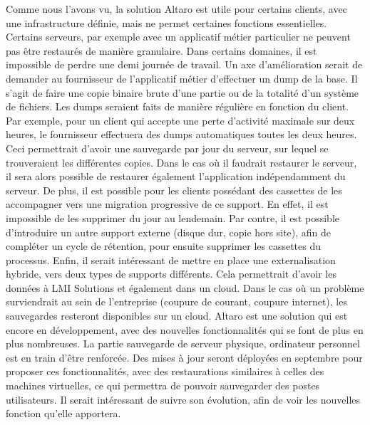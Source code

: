 \documentclass[pfe]{tnreport} %
\begin{document}
Comme nous l'avons vu, la solution Altaro est utile pour certains clients, avec une infrastructure définie, mais ne permet certaines fonctions essentielles. \newline
Certains serveurs, par exemple avec un applicatif métier particulier ne peuvent pas être restaurés de manière granulaire. Dans certains domaines, il est impossible de perdre une demi journée de travail.
Un axe d'amélioration serait de demander au fournisseur de l'applicatif métier d'effectuer un dump de la base. \newline
Il s'agit de faire une copie binaire brute d'une partie ou de la totalité d'un système de fichiers. \newline
Les dumps seraient faits de manière régulière en fonction du client. Par exemple, pour un client qui accepte une perte d'activité maximale sur deux heures, le fournisseur effectuera des dumps automatiques toutes les deux heures. \newline
Ceci permettrait d'avoir une sauvegarde par jour du serveur, sur lequel se trouveraient les différentes copies. Dans le cas où il faudrait restaurer le serveur, il sera alors possible de restaurer également l'application indépendamment du serveur. \newline
De plus, il est possible pour les clients possédant des cassettes de les accompagner vers une migration progressive de ce support. En effet, il est impossible de les supprimer du jour au lendemain. Par contre, il est possible d'introduire un autre support externe (disque dur, copie hors site), afin de compléter un cycle de rétention, pour ensuite supprimer les cassettes du processus. \newline
Enfin, il serait intéressant de mettre en place une externalisation hybride, vers deux types de supports différents. \newline
Cela permettrait d'avoir les données à LMI Solutions et également dans un cloud. Dans le cas où un problème surviendrait au sein de l'entreprise (coupure de courant, coupure internet), les sauvegardes resteront disponibles sur un cloud.\newline
Altaro est une solution qui est encore en développement, avec des nouvelles fonctionnalités qui se font de plus en plus nombreuses. \newline
La partie sauvegarde de serveur physique, ordinateur personnel est en train d'être renforcée. \newline
Des mises à jour seront déployées en septembre pour proposer ces fonctionnalités, avec des restaurations similaires à celles des machines virtuelles, ce qui permettra de pouvoir sauvegarder des postes utilisateurs. \newline
Il serait intéressant de suivre son évolution, afin de voir les nouvelles fonction qu'elle apportera.
\end{document}
